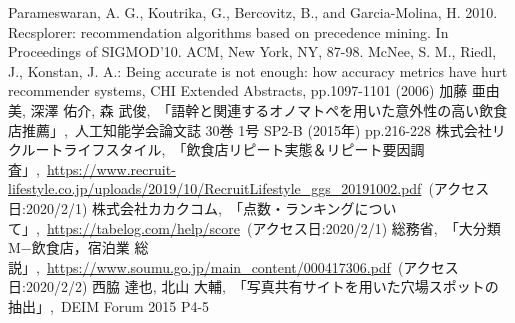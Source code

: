 \documentclass[honka]{nitkcthesis}%
\begin{document}










\backmatter



\begin{thebibliography}{99}
   Parameswaran, A. G., Koutrika, G., Bercovitz, B., and Garcia-Molina, H. 2010. Recsplorer: recommendation algorithms based on precedence mining. In Proceedings of SIGMOD’10. ACM, New York, NY, 87-98.
   McNee, S. M., Riedl, J., Konstan, J. A.: Being accurate is not enough: how accuracy metrics have hurt recommender systems, CHI Extended Abstracts, pp.1097-1101 (2006)
   加藤 亜由美, 深澤 佑介, 森 武俊,~「語幹と関連するオノマトペを用いた意外性の高い飲食店推薦」,~人工知能学会論文誌 30巻 1号 SP2-B (2015年) pp.216-228
  株式会社リクルートライフスタイル,~「飲食店リピート実態＆リピート要因調査」,~\url{https://www.recruit-lifestyle.co.jp/uploads/2019/10/RecruitLifestyle\_ggs\_20191002.pdf}\ (アクセス日:2020/2/1)
  株式会社カカクコム,~「点数・ランキングについて」,~\url{https://tabelog.com/help/score}\ (アクセス日:2020/2/1)
   総務省,~「大分類M−飲食店，宿泊業 総説」,~\url{https://www.soumu.go.jp/main_content/000417306.pdf}\ (アクセス日:2020/2/2)
   西脇 達也, 北山 大輔,~「写真共有サイトを用いた穴場スポットの抽出」,~DEIM Forum 2015 P4-5
\end{thebibliography}


\appendix

\end{document}
